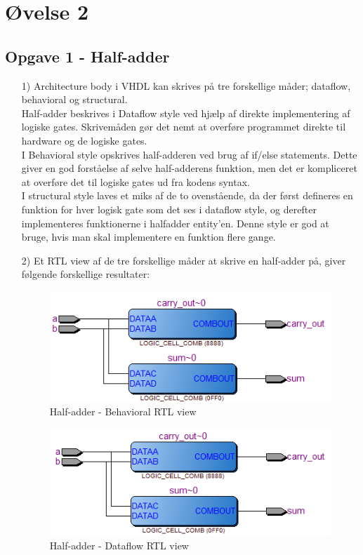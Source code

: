 \section{Øvelse 2}
\subsection{Opgave 1 - Half-adder}
\begin{enumerate}
	\item[1)]
	Architecture body i VHDL kan skrives på tre forskellige måder; dataflow, behavioral og structural. \\
	Half-adder beskrives i Dataflow style ved hjælp af direkte implementering af logiske gates. Skrivemåden gør det nemt at overføre programmet direkte til hardware og de logiske gates. \\
	I Behavioral style opskrives half-adderen ved brug af if/else statements. Dette giver en god forståelse af selve half-adderens funktion, men det er kompliceret at overføre det til logiske gates ud fra kodens syntax. \\
	I structural style laves et miks af de to ovenstående, da der først defineres en funktion for hver logisk gate som det ses i dataflow style, og derefter implementeres funktionerne i halfadder entity’en. Denne style er god at bruge, hvis man skal implementere en funktion flere gange.\\
	\item[2)]
	Et RTL view af de tre forskellige måder at skrive en half-adder på, giver følgende forskellige resultater:\\
\begin{figure}[h]
	\centering
\includegraphics[scale=0.8]{pictures/Oevelse1/Half_adder/Behavioral.JPG}
\caption{Half-adder - Behavioral RTL view}
\label{fig:HaBehavioralRTL}
\end{figure}

\begin{figure}[h]
	\centering
	\includegraphics[scale=0.8]{pictures/Oevelse1/Half_adder/dataflow.JPG}
	\caption{Half-adder - Dataflow RTL view}
	\label{fig:HaDataflowRTL}
\end{figure}


\end{enumerate}
